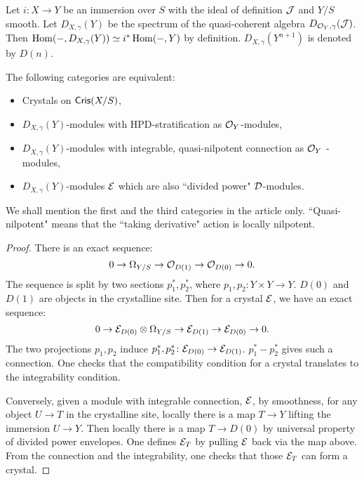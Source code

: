 Let $i \colon X \to Y$ be an immersion over $S$ 
with the ideal of definition ${\mathcal {J}}$ and $Y/S$ smooth. 
Let $D_{X,\gamma}(Y)$ be the spectrum of 
the quasi-coherent algebra $D_{{\mathcal {O}}_Y,\gamma}({\mathcal {J}})$. 
Then $\operatorname{Hom}(-,D_{X,\gamma}(Y)) \simeq i^*\operatorname{Hom}(-,Y)$ by definition. 
$D_{X,\gamma}(Y^{n+1})$ is denoted by $D(n)$. 

\begin{theorem}
    The following categories are equivalent:
    \begin{itemize}
        \item 
            Crystals on $\mathsf{Cris}(X/S)$,
        \item 
            $D_{X,\gamma}(Y)$-modules with HPD-stratification as ${\mathcal {O}}_Y$-modules,
        \item 
            $D_{X,\gamma}(Y)$-modules with integrable, 
            quasi-nilpotent connection as ${\mathcal {O}}_Y$ -modules,
        \item 
            $D_{X,\gamma}(Y)$-modules ${\mathcal {E}}$ 
            which are also  ``divided power" ${\mathcal {D}}$-modules.
    \end{itemize}
    We shall mention the first and the third categories in the article only. 
    ``Quasi-nilpotent" means that 
    the ``taking derivative" action is locally nilpotent.
\end{theorem}

\begin{proof}
    There is an exact sequence:
    \[
        0 \to \Omega_{Y/S} \to {\mathcal {O}}_{D(1)} \to {\mathcal {O}}_{D(0)} \to 0.
    \]
    The sequence is split by two sections $p_1^*, p_2^*$, 
    where $p_1, p_2 \colon Y \times Y \to Y$. 
    $D(0)$ and $D(1)$ are objects in the crystalline site. 
    Then for a crystal ${\mathcal {E}}$, we have an exact sequence:
    \[
        0\to {\mathcal {E}}_{D(0)} \otimes \Omega_{Y/S} 
        \to {\mathcal {E}}_{D(1)} \to {\mathcal {E}}_{D(0)} \to 0.
    \]
    The two projections $p_1, p_2$ induce 
    $p_1^*, p_2^* \colon {\mathcal {E}}_{D(0)} \to {\mathcal {E}}_{D(1)}$. 
    $p_1^* - p_2^*$ gives such a connection. 
    One checks that the compatibility condition for a crystal 
    translates to the integrability condition. 
    
    Conversely, given a module with integrable connection, ${\mathcal {E}}$,
    by smoothness, for any object $U \to T$ in the crystalline site, 
    locally there is a map $T \to Y$ lifting the immersion $U \to Y$. 
    Then locally there is a map $T \to D(0)$ 
    by universal property of divided power envelopes. 
    One defines ${\mathcal {E}}_T$ by pulling ${\mathcal {E}}$ back via the map above. 
    From the connection and the integrability, 
    one checks that those ${\mathcal {E}}_T$ can form a crystal.
\end{proof}

